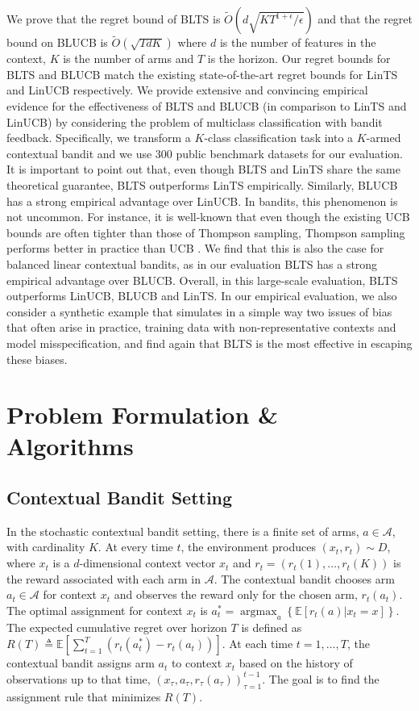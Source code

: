\documentclass[letterpaper]{article} %
\def\A{\mathcal{A}}
\def\E{\mathbb{E}}
\DeclareMathOperator*{\argmax}{argmax}
\begin{document}
We prove that the regret bound of BLTS is $\tilde{O}\left(d\sqrt{K T^{1+\epsilon} / \epsilon}\right)$ and that the regret bound on BLUCB is $\tilde{O}\left(\sqrt{TdK}\right)$
where $d$ is the number of features in the context, $K$ is the number of arms and $T$ is the horizon. 
Our regret bounds for BLTS and BLUCB match the existing state-of-the-art regret bounds for LinTS \cite{agrawal-lints} and LinUCB \cite{chu2011contextual} respectively. 
We provide extensive and convincing empirical evidence for the effectiveness of BLTS and BLUCB (in comparison to LinTS and LinUCB) by considering the problem of multiclass classification with bandit feedback. 
Specifically, we transform a $K$-class classification task into a $K$-armed contextual bandit \cite{dudik-offline-1} and we use 300 public benchmark datasets for our evaluation.
It is important to point out that, even though BLTS and LinTS share the same theoretical guarantee, BLTS outperforms LinTS empirically. Similarly, BLUCB has a strong empirical advantage over LinUCB.
In bandits, this phenomenon is not uncommon. For instance, it is well-known that even though the existing UCB bounds are often tighter than those of Thompson sampling, Thompson sampling performs better in practice than UCB \cite{chapelle-tsucb}.
We find that this is also the case for balanced linear contextual bandits, as in our evaluation BLTS has a strong empirical advantage over BLUCB. 
Overall, in this large-scale evaluation, BLTS outperforms LinUCB, BLUCB and LinTS.
In our empirical evaluation, we also consider a synthetic example  that simulates in a simple way two issues of bias that often arise in practice, training data with non-representative contexts and model misspecification, and find again that BLTS is the most effective in escaping these biases.


\section{Problem Formulation \& Algorithms} \label{designs}

\subsection{Contextual Bandit Setting}
In the stochastic contextual bandit setting, there is a finite set of arms, $a \in \A$, with cardinality $K$. 
At every time $t$, the environment produces $(x_t, r_t) \sim D$, where $x_t$ is a $d$-dimensional context vector $x_t$ and $r_t = \left(r_t(1), \dots, r_t(K)\right)$ is the reward associated with each arm in $\A$.
The contextual bandit chooses arm $a_t \in \A$ for context $x_t$ and observes the reward only for the chosen arm, $r_t(a_t)$.
The optimal assignment for context $x_t$ is $a_t^* = \argmax_a\left\{\E[r_t(a) | x_t=x]\right\}$. 
The expected cumulative regret over horizon $T$ is defined as $R(T) \triangleq \E\left[\sum_{t=1}^{T}\left(r_t(a^*_t) - r_t(a_t)\right)\right]$.
At each time $t = 1, \dots, T$, the contextual bandit assigns arm $a_t$ to context $x_t$ based on the history of observations up to that time, $(x_\tau, a_\tau, r_\tau(a_\tau))_{\tau=1}^{t-1}$.
The goal is to find the assignment rule that minimizes $R(T)$.
\end{document}
